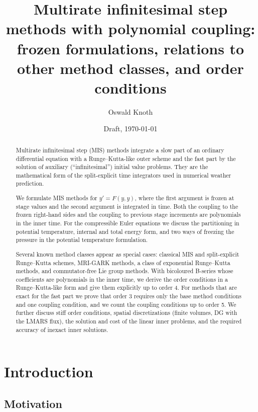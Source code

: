 \documentclass[11pt,a4paper]{article}
\title{Multirate infinitesimal step methods with polynomial coupling:\\
frozen formulations, relations to other method classes, and order conditions}
\author{Oswald Knoth}
\date{Draft, \today}
\theoremstyle{definition}
\theoremstyle{remark}
\begin{document}
\maketitle

\begin{abstract}
Multirate infinitesimal step (MIS) methods integrate a slow part of an
ordinary differential equation with a Runge--Kutta-like outer scheme and
the fast part by the solution of auxiliary (``infinitesimal'') initial
value problems. They are the mathematical form of the split-explicit time
integrators used in numerical weather prediction.

We formulate MIS methods for $y'=F(y,y)$, where the first argument is
frozen at stage values and the second argument is integrated in time.
Both the coupling to the frozen right-hand sides and the coupling to
previous stage increments are polynomials in the inner time. For the
compressible Euler equations we discuss the partitioning in potential
temperature, internal and total energy form, and two ways of freezing
the pressure in the potential temperature formulation.

Several known method classes appear as special cases: classical MIS and
split-explicit Runge--Kutta schemes, MRI-GARK methods, a class of
exponential Runge--Kutta methods, and commutator-free Lie group methods.
With bicoloured B-series whose coefficients are polynomials in the inner
time, we derive the order conditions in a Runge--Kutta-like form and give
them explicitly up to order 4. For methods that are exact for the fast
part we prove that order 3 requires only the base method conditions and
one coupling condition, and we count the coupling conditions up to order
5. We further discuss stiff order conditions, spatial discretizations
(finite volumes, DG with the LMARS flux), the solution and cost of the
linear inner problems, and the required accuracy of inexact inner
solutions.
\end{abstract}

\tableofcontents

\section{Introduction}
\label{sec:motivation}

\subsection{Motivation}
\end{document}
